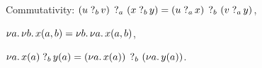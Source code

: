 \documentclass[a4paper]{article}
\begin{document}
\begin{axiom}{Commutativity:}\label{ax-10}
    \( \measure{a}{\measureraw{b}{u}{v}}{\measureraw{b}{x}{y}}
        = \measure{b}{\measureraw{a}{u}{x}}{\measureraw{a}{v}{y}} \),
\end{axiom}

\begin{axiom}{}\label{ax-11}
    \( \new{a}{\new{b}{x{\p{a,b}}}} = \new{b}{\new{a}{x{\p{a,b}}}} \),
\end{axiom}

\begin{axiom}{}\label{ax-12}
    \( \new{a}{\measureraw{b}{x{\p a}}{y{\p a}}}
        = \measure{b}{\new{a}{x{\p a}}}{\new{a}{y{\p a}}} \).
\end{axiom}

\end{document}
